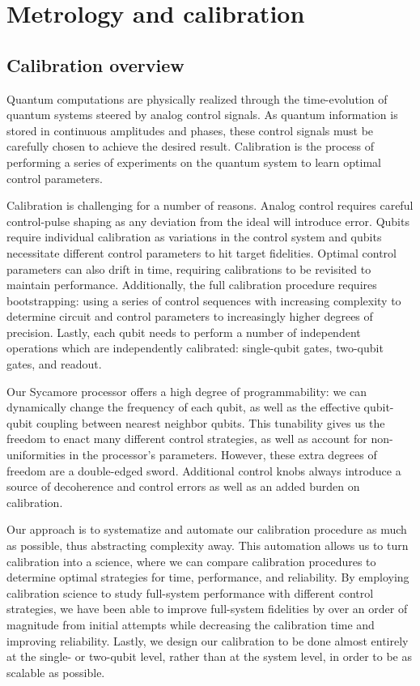 \section{Metrology and calibration}\label{sec:calib_metro}

\subsection{Calibration overview}
Quantum computations are physically realized through the time-evolution of quantum systems steered by analog control signals. As quantum information is stored in continuous amplitudes and phases, these control signals must be carefully chosen to achieve the desired result. Calibration is the process of performing a series of experiments on the quantum system to learn optimal control parameters. 

Calibration is challenging for a number of reasons.  Analog control requires careful control-pulse shaping as any deviation from the ideal will introduce error. Qubits require individual calibration as variations in the control system and qubits necessitate different control parameters to hit target fidelities. Optimal control parameters can also drift in time, requiring calibrations to be revisited to maintain performance. Additionally, the full calibration procedure requires bootstrapping: using a series of control sequences with increasing complexity to determine circuit and control parameters to increasingly higher degrees of precision. Lastly, each qubit needs to perform a number of independent operations which are independently calibrated: single-qubit gates, two-qubit gates, and readout. 

Our Sycamore processor offers a high degree of programmability: we can dynamically change the frequency of each qubit, as well as the effective qubit-qubit coupling between nearest neighbor qubits. This tunability gives us the freedom to enact many different control strategies, as well as account for non-uniformities in the processor's parameters. However, these extra degrees of freedom are a double-edged sword. Additional control knobs always introduce a source of decoherence and control errors as well as an added burden on calibration. 

Our approach is to systematize and automate our calibration procedure as much as possible, thus abstracting complexity away. This automation allows us to turn calibration into a science, where we can compare calibration procedures to determine optimal strategies for time, performance, and reliability. By employing calibration science to study full-system performance with different control strategies, we have been able to improve full-system fidelities by over an order of magnitude from initial attempts while decreasing the calibration time and improving reliability. Lastly, we design our calibration to be done almost entirely at the single- or two-qubit level, rather than at the system level, in order to be as scalable as possible. 

